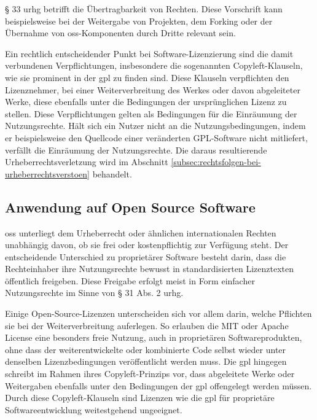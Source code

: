 § 33 \gls{urhg} betrifft die Übertragbarkeit von Rechten.
Diese Vorschrift kann beispielsweise bei der Weitergabe von Projekten, dem Forking oder der Übernahme von \gls{oss}-Komponenten durch Dritte relevant sein.

Ein rechtlich entscheidender Punkt bei Software-Lizenzierung sind die damit verbundenen Verpflichtungen, insbesondere die sogenannten Copyleft-Klauseln, wie sie prominent in der \gls{gpl} zu finden sind.
Diese Klauseln verpflichten den Lizenznehmer, bei einer Weiterverbreitung des Werkes oder davon abgeleiteter Werke, diese ebenfalls unter die Bedingungen der ursprünglichen Lizenz zu stellen.
Diese Verpflichtungen gelten als Bedingungen für die Einräumung der Nutzungsrechte.
Hält sich ein Nutzer nicht an die Nutzungsbedingungen, indem er beispielsweise den Quellcode einer veränderten GPL-Software nicht mitliefert, verfällt die Einräumung der Nutzungsrechte.
Die daraus resultierende Urheberrechtsverletzung wird im Abschnitt \ref{subsec:rechtsfolgen-bei-urheberrechtsverstoen} behandelt.


\subsection{Anwendung auf Open Source Software}

\gls{oss} unterliegt dem Urheberrecht oder ähnlichen internationalen Rechten unabhängig davon, ob sie frei oder kostenpflichtig zur Verfügung steht.
Der entscheidende Unterschied zu proprietärer Software besteht darin, dass die Rechteinhaber ihre Nutzungsrechte bewusst in standardisierten Lizenztexten öffentlich freigeben.
Diese Freigabe erfolgt meist in Form einfacher Nutzungsrechte im Sinne von § 31 Abs. 2 \gls{urhg}.

Einige Open-Source-Lizenzen unterscheiden sich vor allem darin, welche Pflichten sie bei der Weiterverbreitung auferlegen.
So erlauben die MIT oder Apache License eine besonders freie Nutzung, auch in proprietären Softwareprodukten, ohne dass der weiterentwickelte oder kombinierte Code selbst wieder unter denselben Lizenzbedingungen veröffentlicht werden muss.
Die \gls{gpl} hingegen schreibt im Rahmen ihres Copyleft-Prinzips vor, dass abgeleitete Werke oder Weitergaben ebenfalls unter den Bedingungen der \gls{gpl} offengelegt werden müssen.
Durch diese Copyleft-Klauseln sind Lizenzen wie die \gls{gpl} für proprietäre Softwareentwicklung weitestgehend ungeeignet.

